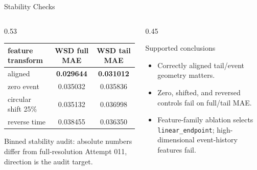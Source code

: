 \documentclass[fontset=fandol,aspectratio=169,10pt]{ctexbeamer}
\newcommand{\smallnote}[1]{{\scriptsize\color{tdltGray}#1}}
\begin{document}
\begin{frame}{Stability Checks}
  \begin{columns}[T,onlytextwidth]
    \begin{column}{0.53\textwidth}
      \begin{table}
        \centering
        \scriptsize
        \begin{tabular}{lcc}
          \toprule
          feature transform & WSD full MAE & WSD tail MAE\\
          \midrule
          aligned & \textbf{0.029644} & \textbf{0.031012}\\
          zero event & 0.035032 & 0.035836\\
          circular shift 25\% & 0.035132 & 0.036998\\
          reverse time & 0.038455 & 0.036350\\
          \bottomrule
        \end{tabular}
      \end{table}
      \smallnote{Binned stability audit: absolute numbers differ from full-resolution Attempt 011, direction is the audit target.}
    \end{column}
    \begin{column}{0.45\textwidth}
      \begin{block}{Supported conclusions}
        \begin{itemize}
          \item Correctly aligned tail/event geometry matters.
          \item Zero, shifted, and reversed controls fail on full/tail MAE.
          \item Feature-family ablation selects \texttt{linear\_endpoint}; high-dimensional event-history features fail.
        \end{itemize}
      \end{block}
    \end{column}
  \end{columns}
\end{frame}
\end{document}
